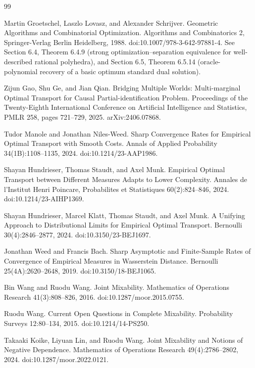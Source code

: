 \documentclass{article}
\begin{document}
\begin{thebibliography}{99}

   Martin Groetschel, Laszlo Lovasz, and Alexander Schrijver. Geometric Algorithms and Combinatorial Optimization. Algorithms and Combinatorics 2, Springer-Verlag Berlin Heidelberg, 1988. doi:10.1007/978-3-642-97881-4. See Section 6.4, Theorem 6.4.9 (strong optimization--separation equivalence for well-described rational polyhedra), and Section 6.5, Theorem 6.5.14 (oracle-polynomial recovery of a basic optimum standard dual solution).

   Zijun Gao, Shu Ge, and Jian Qian. Bridging Multiple Worlds: Multi-marginal Optimal Transport for Causal Partial-identification Problem. Proceedings of the Twenty-Eighth International Conference on Artificial Intelligence and Statistics, PMLR 258, pages 721--729, 2025. arXiv:2406.07868.

   Tudor Manole and Jonathan Niles-Weed. Sharp Convergence Rates for Empirical Optimal Transport with Smooth Costs. Annals of Applied Probability 34(1B):1108--1135, 2024. doi:10.1214/23-AAP1986.

   Shayan Hundrieser, Thomas Staudt, and Axel Munk. Empirical Optimal Transport between Different Measures Adapts to Lower Complexity. Annales de l'Institut Henri Poincare, Probabilites et Statistiques 60(2):824--846, 2024. doi:10.1214/23-AIHP1369.

   Shayan Hundrieser, Marcel Klatt, Thomas Staudt, and Axel Munk. A Unifying Approach to Distributional Limits for Empirical Optimal Transport. Bernoulli 30(4):2846--2877, 2024. doi:10.3150/23-BEJ1697.

   Jonathan Weed and Francis Bach. Sharp Asymptotic and Finite-Sample Rates of Convergence of Empirical Measures in Wasserstein Distance. Bernoulli 25(4A):2620--2648, 2019. doi:10.3150/18-BEJ1065.

   Bin Wang and Ruodu Wang. Joint Mixability. Mathematics of Operations Research 41(3):808--826, 2016. doi:10.1287/moor.2015.0755.

   Ruodu Wang. Current Open Questions in Complete Mixability. Probability Surveys 12:80--134, 2015. doi:10.1214/14-PS250.

   Takaaki Koike, Liyuan Lin, and Ruodu Wang. Joint Mixability and Notions of Negative Dependence. Mathematics of Operations Research 49(4):2786--2802, 2024. doi:10.1287/moor.2022.0121.


\end{thebibliography}
\end{document}
